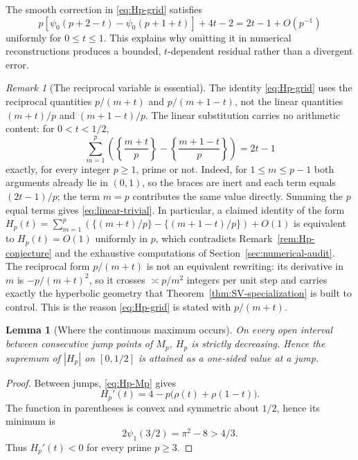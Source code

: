 \documentclass[11pt]{amsart}
\numberwithin{equation}{section}
\newtheorem{lemma}[theorem]{Lemma}
\theoremstyle{definition}
\theoremstyle{remark}
\newtheorem{remark}[theorem]{Remark}
\begin{document}
The smooth correction in \eqref{eq:Hp-grid} satisfies
\begin{equation}\label{eq:Hp-grid-smooth-asymp}
 p\left[\psi_0(p+2-t)-\psi_0(p+1+t)\right]+4t-2
 =2t-1+O(p^{-1})
\end{equation}
uniformly for \(0\le t\le1\).  This explains why omitting it in numerical
reconstructions produces a bounded, \(t\)-dependent residual rather than a
divergent error.

\begin{remark}[The reciprocal variable is essential]\label{rem:reciprocal-essential}
The identity \eqref{eq:Hp-grid} uses the reciprocal quantities
\(p/(m+t)\) and \(p/(m+1-t)\), not the linear quantities
\((m+t)/p\) and \((m+1-t)/p\).  The linear substitution carries no
arithmetic content: for \(0<t<1/2\),
\begin{equation}\label{eq:linear-trivial}
 \sum_{m=1}^{p}
 \left(\left\{\frac{m+t}{p}\right\}-\left\{\frac{m+1-t}{p}\right\}\right)
 =2t-1
\end{equation}
exactly, for every integer \(p\ge1\), prime or not. Indeed, for
\(1\le m\le p-1\) both arguments already lie in \((0,1)\), so the
braces are inert and each term equals \((2t-1)/p\); the term \(m=p\)
contributes the same value directly. Summing the \(p\) equal terms gives
\eqref{eq:linear-trivial}. In particular, a claimed identity of the form
\(H_p(t)=\sum_{m=1}^p(\{(m+t)/p\}-\{(m+1-t)/p\})+O(1)\) is equivalent to
\(H_p(t)=O(1)\) uniformly in \(p\), which contradicts
Remark~\ref{rem:Hp-conjecture} and the exhaustive computations of
Section~\ref{sec:numerical-audit}. The reciprocal form
\(p/(m+t)\) is not an equivalent rewriting: its derivative in \(m\) is
\(-p/(m+t)^2\), so it crosses \(\asymp p/m^2\) integers per unit step and
carries exactly the hyperbolic geometry that
Theorem~\ref{thm:SV-specialization} is built to control. This is the
reason \eqref{eq:Hp-grid} is stated with \(p/(m+t)\).
\end{remark}

\begin{lemma}[Where the continuous maximum occurs]\label{lem:Hp-jumps}
On every open interval between consecutive jump points of \(M_p\),
\(H_p\) is strictly decreasing.  Hence the supremum of \(|H_p|\) on
\([0,1/2]\) is attained as a one-sided value at a jump.
\end{lemma}

\begin{proof}
Between jumps, \eqref{eq:Hp-Mp} gives
\[
 H_p'(t)=4-p\bigl(\rho(t)+\rho(1-t)\bigr).
\]
The function in parentheses is convex and symmetric about \(1/2\), hence
its minimum is
\[
 2\psi_1(3/2)=\pi^2-8>4/3.
\]
Thus \(H_p'(t)<0\) for every prime \(p\ge3\).
\end{proof}
\end{document}
